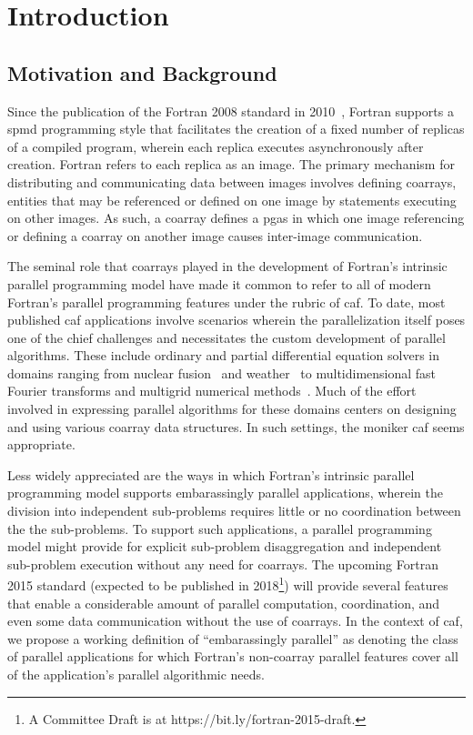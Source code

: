 \section{Introduction}
\subsection{Motivation and Background}
Since the publication of the Fortran 2008 standard in 2010~\cite{iso2010information}, Fortran supports a \gls{spmd}
programming style that facilitates the creation of a fixed number of replicas of a compiled program, wherein each replica
executes asynchronously after creation.  Fortran refers to each replica as an image.  The primary mechanism for distributing and
communicating data between images involves defining \glspl{coarray}, entities that may be referenced or defined on one image by
statements executing on other images.  As such, a coarray defines a \gls{pgas} in which one image referencing or defining a
coarray on another image causes inter-image communication.

The seminal role that \glspl{coarray} played in the development of Fortran's intrinsic parallel programming model have made it
common to refer to all of modern Fortran's parallel programming features under the rubric of \gls{caf}.  To date, most
published \gls{caf} applications involve scenarios wherein the parallelization itself poses one of the chief
challenges and necessitates the custom development of parallel algorithms.  These include ordinary and partial differential
equation solvers in domains ranging from nuclear fusion~\cite{preissl2011multithreaded} and
weather~\cite{mozdzynski2015partitioned} to multidimensional fast Fourier transforms and multigrid numerical
methods~\cite{garain2015comparing}.  Much of the effort involved in
expressing parallel algorithms for these domains centers on
 designing and using various \gls{coarray} data structures.  In such settings, the moniker
\gls{caf} seems appropriate.

Less widely appreciated are the ways in which Fortran's intrinsic parallel programming model supports embarassingly parallel
applications, wherein the division into independent sub-problems requires little or no coordination between the
the sub-problems. To support such applications, a parallel programming
model might provide for explicit sub-problem disaggregation and independent sub-problem execution without any need for \glspl{coarray}.  The upcoming Fortran 2015 standard
(expected to be published in 2018\footnote{A Committee Draft is at https://bit.ly/fortran-2015-draft.}) will provide several
features that enable a considerable amount of parallel computation, coordination, and even some data communication
without the use of \glspl{coarray}.  In the context of \gls{caf}, we propose a working definition of ``embarassingly parallel''
as denoting the class of parallel applications for which Fortran's non-\gls{coarray} parallel features cover all of the
application's parallel algorithmic needs.

